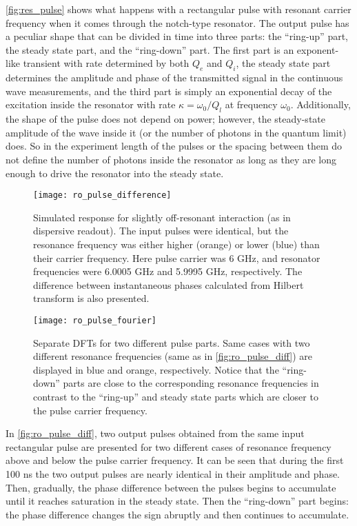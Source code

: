 \autoref{fig:res_pulse} shows what happens with a rectangular pulse with resonant carrier frequency when it comes through the notch-type resonator. The output pulse has a peculiar shape that can be divided in time into three parts: the ``ring-up'' part, the steady state part, and the ``ring-down'' part. The first part is an exponent-like transient with rate determined by both $Q_e$ and $Q_i$, the steady state part  determines the amplitude and phase of the transmitted  signal in the continuous wave measurements, and the third part is simply an exponential decay of the excitation inside the resonator with rate $\kappa = \omega_0/Q_l$ at frequency $\omega_0$. Additionally, the shape of the pulse does not depend on power; however, the steady-state amplitude of the wave inside it (or the number of photons in the quantum limit) does. So in the experiment length of the pulses or the spacing between them do not define the number of photons inside the resonator as long as they are long enough to drive the resonator into the steady state.

\begin{figure}[h!]
\texttt{[image: ro\_pulse\_difference]}
\caption{Simulated response for slightly off-resonant interaction (as in dispersive readout). The input pulses were identical, but the resonance frequency was either higher (orange) or lower (blue) than their carrier frequency. Here pulse carrier was 6 GHz, and resonator frequencies were 6.0005 GHz and 5.9995 GHz, respectively. The difference between instantaneous phases calculated from Hilbert transform is also presented.}
\label{fig:ro_pulse_diff}
\end{figure}

\begin{figure}[h!]
\texttt{[image: ro\_pulse\_fourier]}
\caption{Separate DFTs for two different pulse parts. Same cases with two different resonance frequencies (same as in \autoref{fig:ro_pulse_diff}) are displayed in blue and orange, respectively. Notice that the ``ring-down'' parts are close to the corresponding resonance frequencies in contrast to the ``ring-up'' and steady state parts which are closer to the pulse carrier frequency.}
\end{figure}

In \autoref{fig:ro_pulse_diff}, two output pulses obtained from the same input rectangular pulse are presented for two different cases of resonance frequency above and below the pulse carrier frequency. It can be seen that during the first 100 ns the two output pulses are nearly identical in their amplitude and phase. Then, gradually, the phase difference between the pulses begins to accumulate until it reaches saturation in the steady state. Then the ``ring-down'' part begins: the phase difference changes the sign abruptly and then continues to accumulate. 

